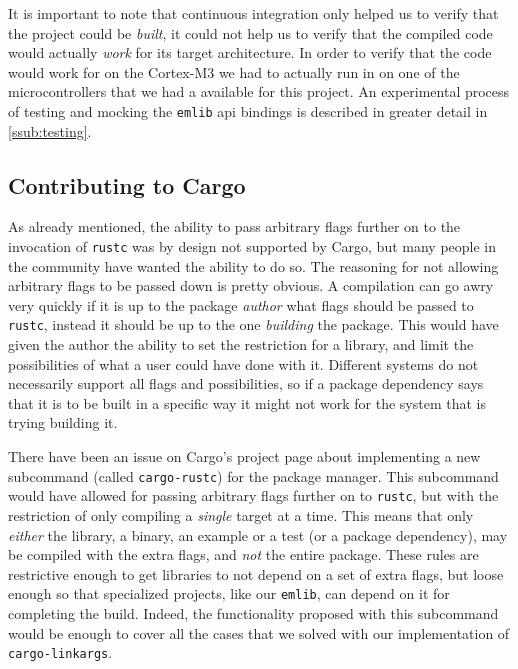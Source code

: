 It is important to note that continuous integration only helped us to verify that the project could be \emph{built}, it could not help us to verify that the compiled code would actually \emph{work} for its target architecture.
In order to verify that the code would work for on the Cortex-M3 we had to actually run in on one of the microcontrollers that we had a available for this project.
An experimental process of testing and mocking the \texttt{emlib} \gls{api} bindings is described in greater detail in \autoref{ssub:testing}.

\subsection{Contributing to Cargo}
\label{ssub:contributing_to_cargo}

As already mentioned, the ability to pass arbitrary flags further on to the invocation of \texttt{rustc} was by design not supported by Cargo, but many people in the {\rust} community have wanted the ability to do so.
The reasoning for not allowing arbitrary flags to be passed down is pretty obvious.
A compilation can go awry very quickly if it is up to the package \emph{author} what flags should be passed to \texttt{rustc}, instead it should be up to the one \emph{building} the package.
This would have given the author the ability to set the restriction for a library, and limit the possibilities of what a user could have done with it.
Different systems do not necessarily support all flags and possibilities, so if a package dependency says that it is to be built in a specific way it might not work for the system that is trying building it.

There have been an issue on Cargo's project page about implementing a new subcommand (called \texttt{cargo-rustc}) for the package manager.
This subcommand would have allowed for passing arbitrary flags further on to \texttt{rustc}, but with the restriction of only compiling a \emph{single} target at a time.
This means that only \emph{either} the library, a binary, an example or a test (or a package dependency), may be compiled with the extra flags, and \emph{not} the entire package.
These rules are restrictive enough to get libraries to not depend on a set of extra flags, but loose enough so that specialized projects, like our \texttt{emlib}, can depend on it for completing the build.
Indeed, the functionality proposed with this subcommand would be enough to cover all the cases that we solved with our implementation of \texttt{cargo-linkargs}.

